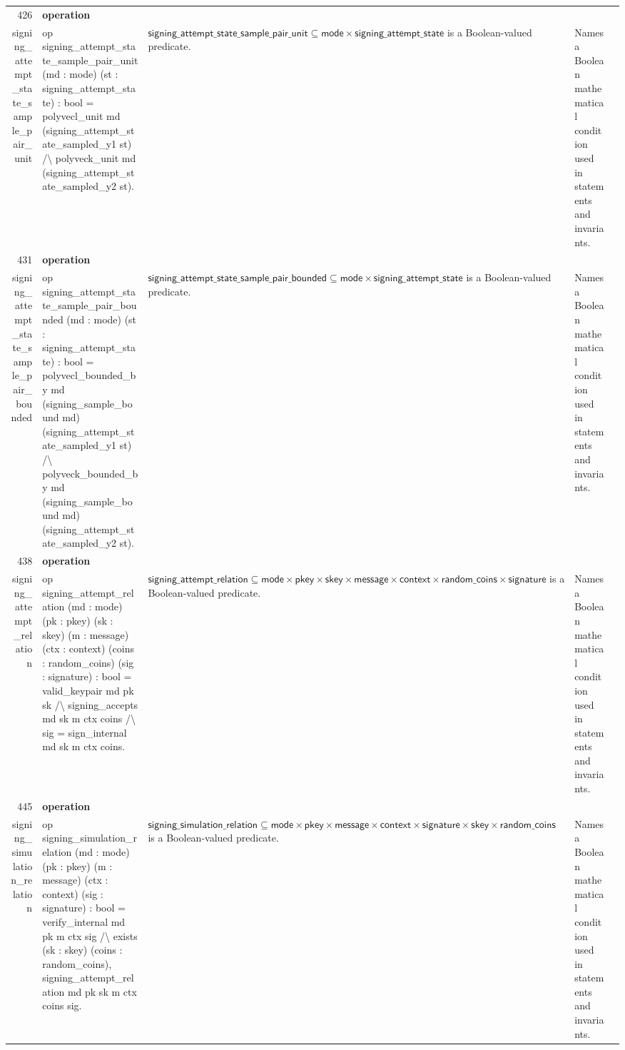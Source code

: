 \documentclass[10pt]{article}
\newcommand{\ec}[1]{\begingroup\ttfamily\scriptsize #1\endgroup}
\begin{document}
\begin{longtable}{r L{0.17\textwidth} L{0.26\textwidth} L{0.27\textwidth} L{0.20\textwidth}}
426 & \textbf{operation}\\\ec{signing\_attempt\_state\_sample\_pair\_unit} & \ec{op signing\_attempt\_state\_sample\_pair\_unit (md : mode) (st : signing\_attempt\_state) : bool = polyvecl\_unit md (signing\_attempt\_state\_sampled\_y1 st) /\textbackslash{} polyveck\_unit md (signing\_attempt\_state\_sampled\_y2 st).} & \(\mathsf{signing\_attempt\_state\_sample\_pair\_unit} \subseteq \mathsf{mode} \times \mathsf{signing\_attempt\_state}\) is a Boolean-valued predicate. & Names a Boolean mathematical condition used in statements and invariants. \\
431 & \textbf{operation}\\\ec{signing\_attempt\_state\_sample\_pair\_bounded} & \ec{op signing\_attempt\_state\_sample\_pair\_bounded (md : mode) (st : signing\_attempt\_state) : bool = polyvecl\_bounded\_by md (signing\_sample\_bound md) (signing\_attempt\_state\_sampled\_y1 st) /\textbackslash{} polyveck\_bounded\_by md (signing\_sample\_bound md) (signing\_attempt\_state\_sampled\_y2 st).} & \(\mathsf{signing\_attempt\_state\_sample\_pair\_bounded} \subseteq \mathsf{mode} \times \mathsf{signing\_attempt\_state}\) is a Boolean-valued predicate. & Names a Boolean mathematical condition used in statements and invariants. \\
438 & \textbf{operation}\\\ec{signing\_attempt\_relation} & \ec{op signing\_attempt\_relation (md : mode) (pk : pkey) (sk : skey) (m : message) (ctx : context) (coins : random\_coins) (sig : signature) : bool = valid\_keypair md pk sk /\textbackslash{} signing\_accepts md sk m ctx coins /\textbackslash{} sig = sign\_internal md sk m ctx coins.} & \(\mathsf{signing\_attempt\_relation} \subseteq \mathsf{mode} \times \mathsf{pkey} \times \mathsf{skey} \times \mathsf{message} \times \mathsf{context} \times \mathsf{random\_coins} \times \mathsf{signature}\) is a Boolean-valued predicate. & Names a Boolean mathematical condition used in statements and invariants. \\
445 & \textbf{operation}\\\ec{signing\_simulation\_relation} & \ec{op signing\_simulation\_relation (md : mode) (pk : pkey) (m : message) (ctx : context) (sig : signature) : bool = verify\_internal md pk m ctx sig /\textbackslash{} exists (sk : skey) (coins : random\_coins), signing\_attempt\_relation md pk sk m ctx coins sig.} & \(\mathsf{signing\_simulation\_relation} \subseteq \mathsf{mode} \times \mathsf{pkey} \times \mathsf{message} \times \mathsf{context} \times \mathsf{signature} \times \mathsf{skey} \times \mathsf{random\_coins}\) is a Boolean-valued predicate. & Names a Boolean mathematical condition used in statements and invariants. \\

\end{longtable}
\end{document}
